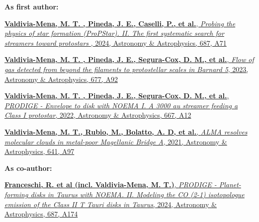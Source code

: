 \vspace{10pt}

\begin{cvparagraph}
\textbf{As first author:}
\vspace{4pt}
\begin{cvitems} %
	\item{\href{https://ui.adsabs.harvard.edu/abs/2024A%26A...687A..71V/abstract}{ \textbf{Valdivia-Mena, M. T. , Pineda, J. E., Caselli, P., et al.}, \textit{Probing the physics of star formation (ProPStar). II. The first systematic search for streamers toward protostars }, 2024, Astronomy \& Astrophysics, 687, A71}}
	\item{\href{https://ui.adsabs.harvard.edu/abs/2023A%26A...677A..92V/abstract}{ \textbf{Valdivia-Mena, M. T. , Pineda, J. E., Segura-Cox, D. M., et al.}, \textit{Flow of gas detected from beyond the filaments to protostellar scales in Barnard 5}, 2023, Astronomy \& Astrophysics, 677, A92}}
	\item{\href{https://ui.adsabs.harvard.edu/abs/2022A%26A...667A..12V/abstract}{\textbf{Valdivia-Mena, M. T. , Pineda, J. E., Segura-Cox, D. M., et al.}, \textit{PRODIGE - Envelope to disk with NOEMA I. A 3000 au streamer feeding a Class I protostar}, 2022, Astronomy \& Astrophysics, 667, A12} }
	\item{\href{https://ui.adsabs.harvard.edu/abs/2020A%26A...641A..97V/abstract}{ \textbf{Valdivia-Mena, M. T., Rubio, M., Bolatto, A. D, et al.}, \textit{ALMA resolves molecular clouds in metal-poor Magellanic Bridge A}, 2021, Astronomy \& Astrophysics, 641, A97}}
\end{cvitems}
\vspace{8pt}
\textbf{As co-author:}
\vspace{4pt}
\begin{cvitems} %
	\item{\href{https://ui.adsabs.harvard.edu/abs/2024A%26A...687A.174F/abstract}{\textbf{Franceschi, R. et al (incl. Valdivia-Mena, M. T.)}, \textit{PRODIGE - Planet-forming disks in Taurus with NOEMA. II. Modeling the CO (2-1) isotopologue emission of the Class II T Tauri disks in Taurus}, 2024, Astronomy \& Astrophysics, 687, A174}}

\end{cvitems}
\end{cvparagraph}
